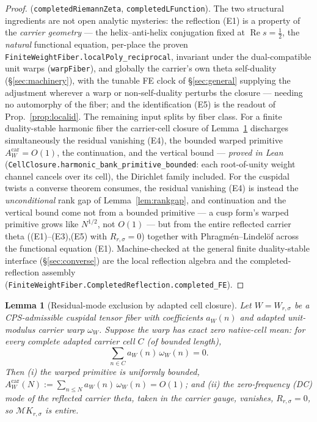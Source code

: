 \documentclass[11pt]{article}
\newtheorem{lemma}[theorem]{Lemma}
\theoremstyle{definition}
\renewcommand{\Re}{\operatorname{Re}}
\begin{document}
\begin{proof}
(\texttt{completedRiemannZeta}, \texttt{completedLFunction}). The two structural ingredients are not open
analytic mysteries: the reflection \textup{(E1)} is a property of the \emph{carrier geometry} --- the
helix--anti-helix conjugation fixed at $\Re s=\tfrac12$, the \emph{natural} functional equation, per-place
the proven \texttt{FiniteWeightFiber.localPoly\_reciprocal}, invariant under the dual-compatible unit warps
(\texttt{warpFiber}), and globally the carrier's own theta self-duality (\S\ref{sec:machinery}), with the
tunable FE clock of \S\ref{sec:general} supplying the adjustment wherever a warp or non-self-duality
perturbs the closure --- needing no automorphy of the fiber; and the identification \textup{(E5)} is the
readout of Prop.~\ref{prop:localid}. The remaining input splits by fiber class. For a finite duality-stable
harmonic fiber the carrier-cell closure of Lemma~\ref{lem:residual} discharges simultaneously the residual
vanishing \textup{(E4)}, the bounded warped primitive $A^{\mathrm{car}}_W=O(1)$, the continuation, and the
vertical bound --- \emph{proved in Lean} (\texttt{CellClosure.harmonic\_bank\_primitive\_bounded}: each
root-of-unity weight channel cancels over its cell), the Dirichlet family included. For the cuspidal twists a
converse theorem consumes, the residual vanishing \textup{(E4)} is instead the \emph{unconditional} rank gap
of Lemma~\ref{lem:rankgap}, and continuation and the vertical bound come not from a bounded primitive --- a
cusp form's warped primitive grows like $N^{1/2}$, not $O(1)$ --- but from the entire reflected carrier theta
(\textup{(E1)--(E3),(E5)} with $R_{r,\sigma}=0$) together with Phragm\'en--Lindel\"of across the functional
equation \textup{(E1)}. Machine-checked at the general finite
duality-stable interface (\S\ref{sec:converse}) are the local reflection algebra and the
completed-reflection assembly (\texttt{FiniteWeightFiber.CompletedReflection.completed\_FE}).
\end{proof}

\begin{lemma}[Residual-mode exclusion by adapted cell closure]\label{lem:residual}
Let $W=W_{r,\sigma}$ be a CPS-admissible cuspidal tensor fiber with coefficients $a_W(n)$ and adapted
unit-modulus carrier warp $\omega_W$. Suppose the warp has \emph{exact zero native-cell mean}: for every
complete adapted carrier cell $C$ (of bounded length),
\[
  \sum_{n\in C} a_W(n)\,\omega_W(n)=0 .
\]
Then \textup{(i)} the warped primitive is uniformly bounded,
$A^{\mathrm{car}}_W(N):=\sum_{n\le N} a_W(n)\,\omega_W(n)=O(1)$; and \textup{(ii)} the zero-frequency (DC)
mode of the reflected carrier theta, taken in the carrier gauge, vanishes, $R_{r,\sigma}=0$, so
$\mathcal M K_{r,\sigma}$ is entire.
\end{lemma}
\end{document}
